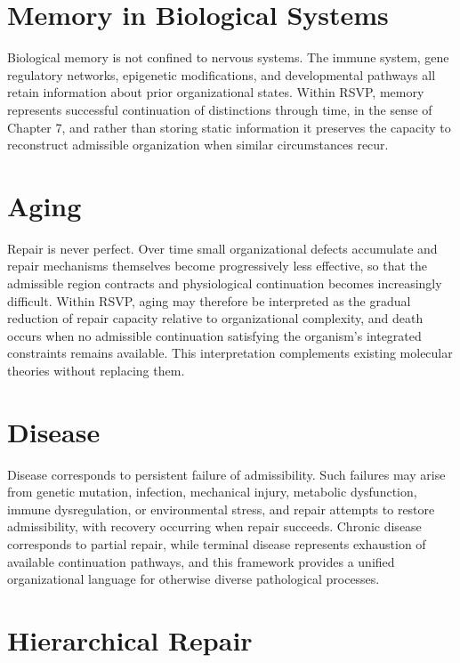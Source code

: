 \documentclass[11pt,oneside]{book}
\numberwithin{equation}{chapter}
\theoremstyle{definition}
\theoremstyle{plain}
\begin{document}
\section{Memory in Biological Systems}

Biological memory is not confined to nervous systems. The immune system, gene regulatory networks, epigenetic modifications, and developmental pathways all retain information about prior organizational states. Within RSVP, memory represents successful continuation of distinctions through time, in the sense of Chapter 7, and rather than storing static information it preserves the capacity to reconstruct admissible organization when similar circumstances recur.

\section{Aging}

Repair is never perfect. Over time small organizational defects accumulate and repair mechanisms themselves become progressively less effective, so that the admissible region contracts and physiological continuation becomes increasingly difficult. Within RSVP, aging may therefore be interpreted as the gradual reduction of repair capacity relative to organizational complexity, and death occurs when no admissible continuation satisfying the organism's integrated constraints remains available. This interpretation complements existing molecular theories without replacing them.

\section{Disease}

Disease corresponds to persistent failure of admissibility. Such failures may arise from genetic mutation, infection, mechanical injury, metabolic dysfunction, immune dysregulation, or environmental stress, and repair attempts to restore admissibility, with recovery occurring when repair succeeds. Chronic disease corresponds to partial repair, while terminal disease represents exhaustion of available continuation pathways, and this framework provides a unified organizational language for otherwise diverse pathological processes.

\section{Hierarchical Repair}
\end{document}
